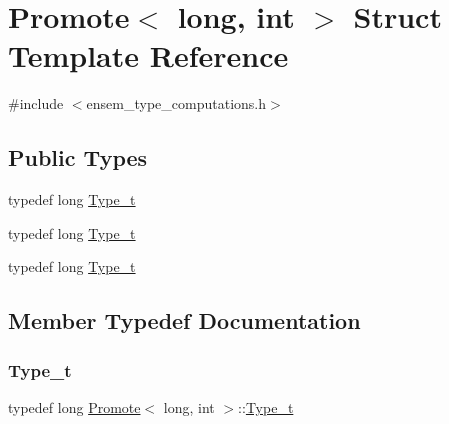 \hypertarget{structPromote_3_01long_00_01int_01_4}{}\section{Promote$<$ long, int $>$ Struct Template Reference}
\label{structPromote_3_01long_00_01int_01_4}


{\ttfamily \#include $<$ensem\+\_\+type\+\_\+computations.\+h$>$}

\subsection*{Public Types}
\begin{DoxyCompactItemize}
\item 
typedef long \mbox{\hyperlink{structPromote_3_01long_00_01int_01_4_ab0ceeb6c9abec4d97d5caab44831ba92}{Type\+\_\+t}}
\item 
typedef long \mbox{\hyperlink{structPromote_3_01long_00_01int_01_4_ab0ceeb6c9abec4d97d5caab44831ba92}{Type\+\_\+t}}
\item 
typedef long \mbox{\hyperlink{structPromote_3_01long_00_01int_01_4_ab0ceeb6c9abec4d97d5caab44831ba92}{Type\+\_\+t}}
\end{DoxyCompactItemize}


\subsection{Member Typedef Documentation}
\mbox{\label{structPromote_3_01long_00_01int_01_4_ab0ceeb6c9abec4d97d5caab44831ba92}} 
\subsubsection{\texorpdfstring{Type\_t}{Type\_t}\hspace{0.1cm}{\footnotesize\ttfamily [1/3]}}
{\footnotesize\ttfamily typedef long \mbox{\hyperlink{structPromote}{Promote}}$<$ long, int $>$\+::\mbox{\hyperlink{structPromote_3_01long_00_01int_01_4_ab0ceeb6c9abec4d97d5caab44831ba92}{Type\+\_\+t}}}

\mbox{\label{structPromote_3_01long_00_01int_01_4_ab0ceeb6c9abec4d97d5caab44831ba92}} 
